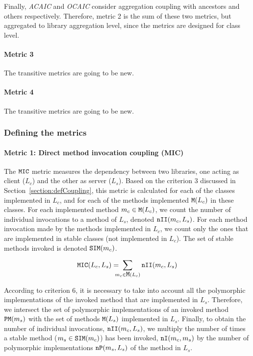 Finally, \textit{ACAIC} and \textit{OCAIC} consider aggregation coupling with ancestors and others respectively. Therefore, metric 2 is the sum of these two metrics, but aggregated to library aggregation level, since the metrics are designed for class level.

\paragraph{Metric 3}
The transitive metrics are going to be new.

\paragraph{Metric 4}
The transitive metrics are going to be new.


\subsubsection{Defining the metrics}\label{subsec:metric-definition}
\paragraph{Metric 1: Direct method invocation coupling (MIC)}
The $\verb|MIC|$ metric measures the dependency between two libraries, one acting as client ($L_c$) and the other as server ($L_s$).%
Based on the criterion 3 discussed in Section~\ref{section:defCoupling}, this metric is calculated for each of the classes implemented in $L_c$, and for each of the methods implemented $\verb|M|(L_c)$ in these classes. For each implemented method  $m_c \in \verb|M|(L_c)$, we count the number of individual invocations to a method of $L_s$, denoted $\verb|nII|(m_c,L_s)$. For each method invocation made by the methods implemented in $L_c$, we count only the ones that are implemented in stable classes (not implemented in $L_c$). The set of stable methods invoked is denoted $\verb|SIM|(m_c)$.

\begin{equation*}
\verb|MIC|(L_c, L_s) =\!\!\!\!\! \sum_{m_c \in \verb|M|(L_c)} \verb|nII|(m_c, L_s)
\end{equation*}

According to criterion 6, it is necessary to take into account all the polymorphic implementations of the invoked method that are implemented in $L_s$. Therefore, we intersect the set of polymorphic implementations of an invoked method $\verb|PM|(m_s)$ with the set of methods $\verb|M|(L_s)$ implemented in $L_s$. Finally, to obtain the number of individual invocations, $\verb|nII|(m_c,L_s)$, we multiply the number of times a stable method ($m_s \in \verb|SIM|(m_c)$) has been invoked, $\verb|nI|(m_c, m_s)$ by the number of polymorphic implementations $\verb|nP|(m_s, L_s)$ of the method in $L_s$.

